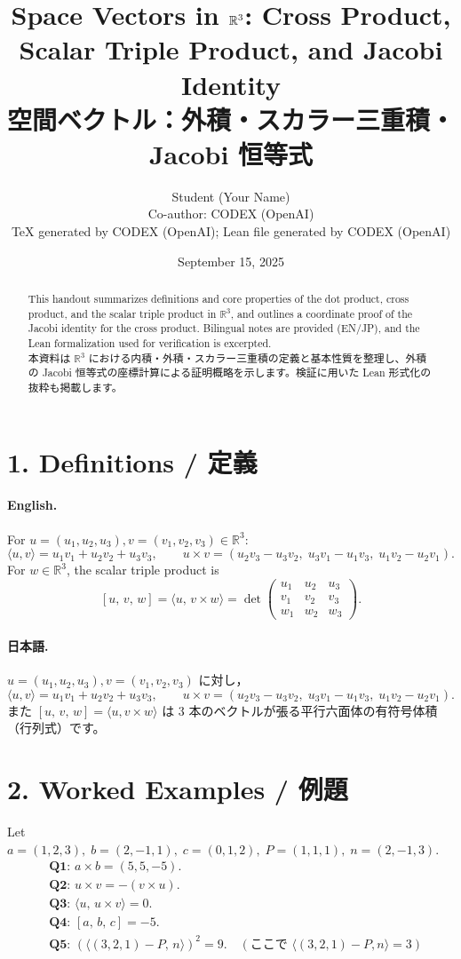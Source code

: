 \documentclass[12pt]{article}
\title{Space Vectors in \(\R^3\): Cross Product, Scalar Triple Product, and Jacobi Identity\\
空間ベクトル：外積・スカラー三重積・Jacobi 恒等式}
\author{Student (Your Name) \\
Co-author: CODEX (OpenAI)\\
\small TeX generated by CODEX (OpenAI); Lean file generated by CODEX (OpenAI)}
\date{September 15, 2025}
\newcommand{\R}{\mathbb{R}}
\newcommand{\cross}{\times}
\newcommand{\triple}[3]{\left[ #1,\,#2,\,#3 \right]}
\begin{document}
\maketitle

\begin{abstract}
This handout summarizes definitions and core properties of the dot product, cross product, and the scalar triple product in \(\R^3\), and outlines a coordinate proof of the Jacobi identity for the cross product. Bilingual notes are provided (EN/JP), and the Lean formalization used for verification is excerpted.\\
本資料は \(\R^3\) における内積・外積・スカラー三重積の定義と基本性質を整理し、外積の Jacobi 恒等式の座標計算による証明概略を示します。検証に用いた Lean 形式化の抜粋も掲載します。
\end{abstract}

\section*{1. Definitions / 定義}
\paragraph{English.}
For \(u=(u_1,u_2,u_3), v=(v_1,v_2,v_3)\in\R^3\):
\[
\langle u,v\rangle = u_1 v_1 + u_2 v_2 + u_3 v_3,\qquad
u\cross v = (u_2 v_3 - u_3 v_2,\; u_3 v_1 - u_1 v_3,\; u_1 v_2 - u_2 v_1).
\]
For \(w\in\R^3\), the scalar triple product is
\[
\triple{u}{v}{w} = \langle u,\, v\cross w\rangle = \det\begin{pmatrix}
u_1 & u_2 & u_3\\ v_1 & v_2 & v_3\\ w_1 & w_2 & w_3
\end{pmatrix}.
\]
\paragraph{日本語.}
\(u=(u_1,u_2,u_3), v=(v_1,v_2,v_3)\) に対し，
\[
\langle u,v\rangle = u_1 v_1 + u_2 v_2 + u_3 v_3,\qquad
u\cross v = (u_2 v_3 - u_3 v_2,\; u_3 v_1 - u_1 v_3,\; u_1 v_2 - u_2 v_1).
\]
また \(\triple{u}{v}{w} = \langle u, v\cross w\rangle\) は 3 本のベクトルが張る平行六面体の有符号体積（行列式）です。

\section*{2. Worked Examples / 例題}
Let \(a=(1,2,3),\; b=(2,-1,1),\; c=(0,1,2),\; P=(1,1,1),\; n=(2,-1,3)\).
\begin{align*}
&\textbf{Q1: } a\cross b = (5,5,-5).\\
&\textbf{Q2: } u\cross v = - (v\cross u).\\
&\textbf{Q3: } \langle u,\, u\cross v\rangle = 0.\\
&\textbf{Q4: } \triple{a}{b}{c} = -5.\\
&\textbf{Q5: } (\langle (3,2,1) - P,\, n\rangle)^2 = 9.\quad (\text{ここで }\langle (3,2,1)-P, n\rangle = 3)
\end{align*}
\end{document}
